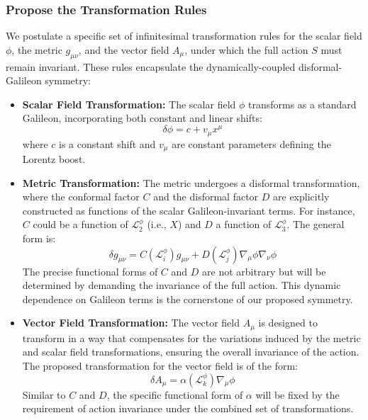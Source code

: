 \documentclass[twocolumn]{aastex631}
\begin{document}
\subsubsection{Propose the Transformation Rules}
We postulate a specific set of infinitesimal transformation rules for the scalar field $\phi$, the metric $g_{\mu\nu}$, and the vector field $A_\mu$, under which the full action $S$ must remain invariant. These rules encapsulate the dynamically-coupled disformal-Galileon symmetry:
\begin{itemize}
    \item \textbf{Scalar Field Transformation:} The scalar field $\phi$ transforms as a standard Galileon, incorporating both constant and linear shifts:
    $$
    \delta \phi = c + v_\mu x^\mu
    $$
    where $c$ is a constant shift and $v_\mu$ are constant parameters defining the Lorentz boost.
    \item \textbf{Metric Transformation:} The metric undergoes a disformal transformation, where the conformal factor $C$ and the disformal factor $D$ are explicitly constructed as functions of the scalar Galileon-invariant terms. For instance, $C$ could be a function of $\mathcal{L}_2^\phi$ (i.e., $X$) and $D$ a function of $\mathcal{L}_3^\phi$. The general form is:
    $$
    \delta g_{\mu\nu} = C(\mathcal{L}_i^\phi) g_{\mu\nu} + D(\mathcal{L}_j^\phi) \nabla_\mu \phi \nabla_\nu \phi
    $$
    The precise functional forms of $C$ and $D$ are not arbitrary but will be determined by demanding the invariance of the full action. This dynamic dependence on Galileon terms is the cornerstone of our proposed symmetry.
    \item \textbf{Vector Field Transformation:} The vector field $A_\mu$ is designed to transform in a way that compensates for the variations induced by the metric and scalar field transformations, ensuring the overall invariance of the action. The proposed transformation for the vector field is of the form:
    $$
    \delta A_\mu = \alpha(\mathcal{L}_k^\phi) \nabla_\mu \phi
    $$
    Similar to $C$ and $D$, the specific functional form of $\alpha$ will be fixed by the requirement of action invariance under the combined set of transformations.


\end{itemize}
\end{document}
